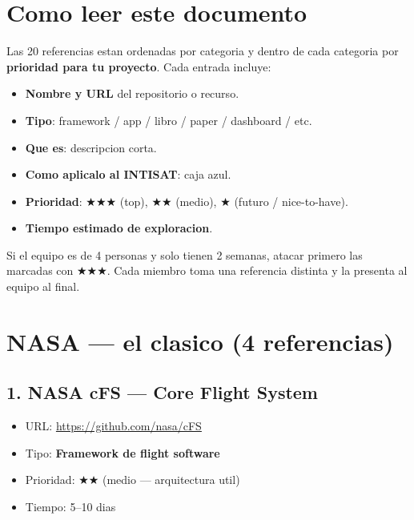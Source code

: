 \documentclass[11pt,a4paper,oneside]{report}
\begin{document}
\tableofcontents
\clearpage

\chapter{Como leer este documento}

Las 20 referencias estan ordenadas por categoria y dentro de cada
categoria por \textbf{prioridad para tu proyecto}. Cada entrada incluye:

\begin{itemize}[leftmargin=2em]
  \item \textbf{Nombre y URL} del repositorio o recurso.
  \item \textbf{Tipo}: framework / app / libro / paper / dashboard / etc.
  \item \textbf{Que es}: descripcion corta.
  \item \textbf{Como aplicalo al INTISAT}: caja azul.
  \item \textbf{Prioridad}: $\bigstar\bigstar\bigstar$ (top), $\bigstar\bigstar$ (medio),
        $\bigstar$ (futuro / nice-to-have).
  \item \textbf{Tiempo estimado de exploracion}.
\end{itemize}

\begin{recomendacion}
Si el equipo es de 4 personas y solo tienen 2 semanas, atacar primero
las marcadas con $\bigstar\bigstar\bigstar$. Cada miembro toma una
referencia distinta y la presenta al equipo al final.
\end{recomendacion}

\chapter{NASA --- el clasico (4 referencias)}

\section{1. NASA cFS --- Core Flight System}

\begin{itemize}[leftmargin=1.5em]
  \item URL: \url{https://github.com/nasa/cFS}
  \item Tipo: \textbf{Framework de flight software}
  \item Prioridad: $\bigstar\bigstar$ (medio --- arquitectura util)
  \item Tiempo: 5--10 dias
\end{itemize}
\end{document}

